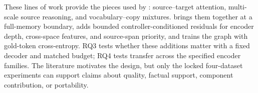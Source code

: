 These lines of work provide the pieces used by \AFMR: source--target attention, multi-scale source reasoning, and vocabulary--copy mixtures. \AFMR brings them together at a full-memory boundary, adds bounded controller-conditioned residuals for encoder depth, cross-space features, and source-span priority, and trains the graph with gold-token cross-entropy. RQ3 tests whether these additions matter with a fixed decoder and matched budget; RQ4 tests transfer across the specified encoder families. The literature motivates the design, but only the locked four-dataset experiments can support claims about quality, factual support, component contribution, or portability.

